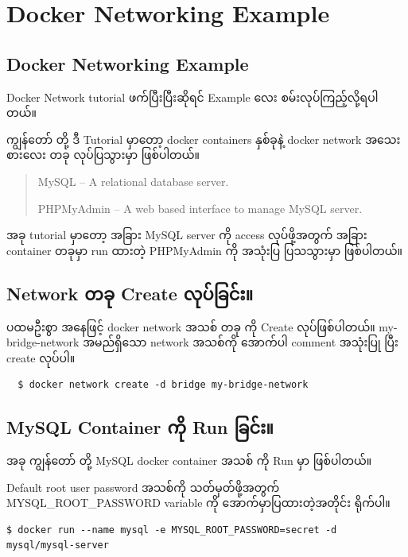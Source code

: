 \documentclass{article}
\begin{document}
\pagebreak

\section{Docker Networking Example}\label{docker-networking-example}

\subsection{Docker Networking
Example}\label{docker-networking-example-1}

Docker Network tutorial ဖက်ပြီးပြီးဆိုရင် Example လေး
စမ်းလုပ်ကြည့်လို့ရပါတယ်။

ကျွန်တော် တို့ ဒီ Tutorial မှာတော့ docker containers နှစ်ခုနဲ့ docker
network အသေးစားလေး တခု လုပ်ပြသွားမှာ ဖြစ်ပါတယ်။

\begin{quote}
MySQL -- A relational database server.

PHPMyAdmin -- A web based interface to manage MySQL server.
\end{quote}

အခု tutorial မှာတော့ အခြား MySQL server ကို access လုပ်ဖို့အတွက် အခြား
container တခုမှာ run ထားတဲ့ PHPMyAdmin ကို အသုံးပြ ပြသသွားမှာ ဖြစ်ပါတယ်။

\subsection{Network တခု Create လုပ်ခြင်း။}\label{network--create-}

ပထမဦးစွာ အနေဖြင့် docker network အသစ် တခု ကို Create လုပ်ဖြစ်ပါတယ်။
my-bridge-network အမည်ရှိသော network အသစ်ကို အောက်ပါ comment အသုံးပြု
ပြီး create လုပ်ပါ။

\begin{verbatim}
  $ docker network create -d bridge my-bridge-network
\end{verbatim}

\subsection{MySQL Container ကို Run ခြင်း။}\label{mysql-container--run-}

အခု ကျွန်တော် တို့ MySQL docker container အသစ် ကို Run မှာ ဖြစ်ပါတယ်။

Default root user password အသစ်ကို သတ်မှတ်ဖို့အတွက်
MYSQL\_ROOT\_PASSWORD variable ကို အောက်မှာပြထားတဲ့အတိုင်း ရိုက်ပါ။

\begin{verbatim}
$ docker run --name mysql -e MYSQL_ROOT_PASSWORD=secret -d mysql/mysql-server
\end{verbatim}
\end{document}
